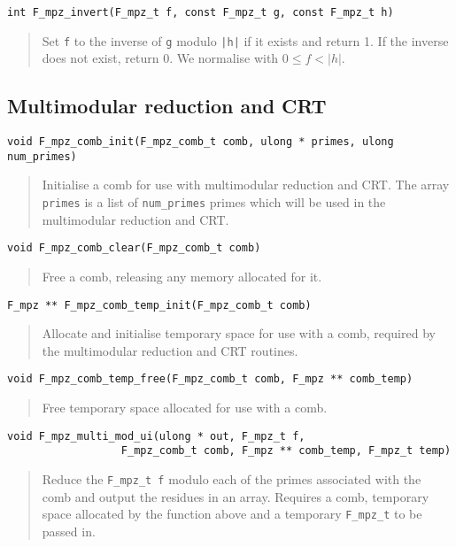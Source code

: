 \documentclass[a4paper,10pt]{article}
\newcommand{\code}{\lstinline}
\begin{document}
\begin{lstlisting}
int F_mpz_invert(F_mpz_t f, const F_mpz_t g, const F_mpz_t h)
\end{lstlisting}
\begin{quote}
Set \code{f} to the inverse of \code{g} modulo \code{|h|} if it exists and return 1. If the inverse does not exist, return 0. We normalise with $0 \leq f < |h|$.
\end{quote}

\subsection{Multimodular reduction and CRT}

\begin{lstlisting}
void F_mpz_comb_init(F_mpz_comb_t comb, ulong * primes, ulong num_primes)
\end{lstlisting}
\begin{quote}
Initialise a comb for use with multimodular reduction and CRT. The array \code{primes} is a list of \code{num_primes} primes which will be used in the multimodular reduction and CRT.
\end{quote}

\begin{lstlisting}
void F_mpz_comb_clear(F_mpz_comb_t comb)
\end{lstlisting}
\begin{quote}
Free a comb, releasing any memory allocated for it.
\end{quote}

\begin{lstlisting}
F_mpz ** F_mpz_comb_temp_init(F_mpz_comb_t comb)
\end{lstlisting}
\begin{quote}
Allocate and initialise temporary space for use with a comb, required by the multimodular reduction and CRT routines.
\end{quote}

\begin{lstlisting}
void F_mpz_comb_temp_free(F_mpz_comb_t comb, F_mpz ** comb_temp)
\end{lstlisting}
\begin{quote}
Free temporary space allocated for use with a comb.
\end{quote}

\begin{lstlisting}
void F_mpz_multi_mod_ui(ulong * out, F_mpz_t f, 
                  F_mpz_comb_t comb, F_mpz ** comb_temp, F_mpz_t temp)
\end{lstlisting}
\begin{quote}
Reduce the \code{F_mpz_t f} modulo each of the primes associated with the comb and output the residues in an array. Requires a comb, temporary space allocated by the function above and a temporary \code{F_mpz_t} to be passed in.
\end{quote}
\end{document}
